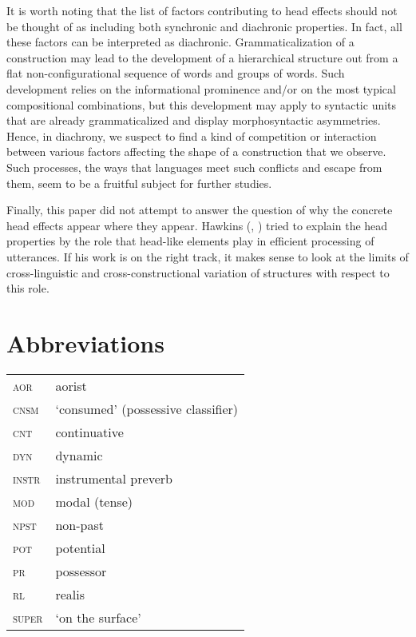 \documentclass[output=paper
  ,nobabel
  ,draftmode
  ,colorlinks, citecolor=brown
]{langscibook}
\begin{document}
It is worth noting that the list of factors contributing to head effects should not be thought of as
including both synchronic and diachronic properties. In fact, all these factors can be interpreted
as diachronic. Grammaticalization of a construction may lead to the development of a hierarchical
structure out from a flat non-configurational sequence of words and groups of words. Such
development relies on the informational prominence and/or on the most typical compositional
combinations, but this development may apply to syntactic units that are already grammaticalized and
display morphosyntactic asymmetries. Hence, in diachrony, we suspect to find a kind of competition
or interaction between various factors affecting the shape of a construction that we observe. Such
processes, the ways that languages meet such conflicts and escape from them, seem to be a fruitful
subject for further studies.

Finally, this paper did not attempt to answer the question of why the concrete head effects appear where they appear. Hawkins (\citeyear{Hawkins1993}, \citeyear[343--358]{Hawkins1995}) tried to explain the head properties by the role that head-like elements play in efficient processing of utterances. If his work is on the right track, it makes sense to look at the limits of cross-linguistic and cross-constructional variation of structures with respect to this role. 

\section*{Abbreviations}

\begin{tabularx}{.99\textwidth}{@{}lX}
\textsc{aor}	& aorist\\
\textsc{cnsm}	& `consumed' (possessive classifier)\\
\textsc{cnt}	& continuative\\
\textsc{dyn}	& dynamic\\
\textsc{instr}	& instrumental preverb\\
\textsc{mod}	& modal (tense)\\
\textsc{npst}	& non-past\\
\textsc{pot}	& potential\\
\textsc{pr}	& possessor\\
\textsc{rl}	& realis\\
\textsc{super}	& `on the surface'\\
\end{tabularx}
\end{document}
